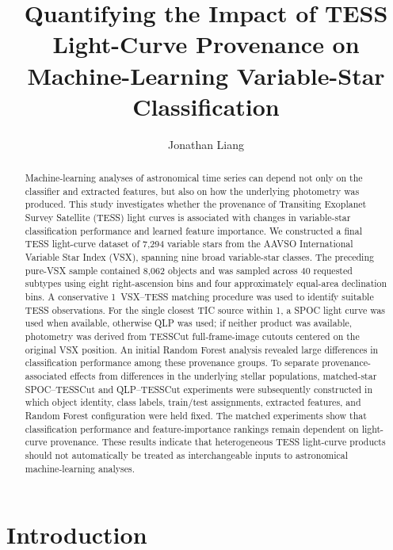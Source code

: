 \documentclass[linenumbers]{aastex701}
\begin{document}
\title{Quantifying the Impact of TESS Light-Curve Provenance on Machine-Learning Variable-Star Classification}
\author{Jonathan Liang}

\begin{abstract}
Machine-learning analyses of astronomical time series can depend not only on the classifier and extracted features, but also on how the underlying photometry was produced. This study investigates whether the provenance of Transiting Exoplanet Survey Satellite (TESS) light curves is associated with changes in variable-star classification performance and learned feature importance. We constructed a final TESS light-curve dataset of 7,294 variable stars from the AAVSO International Variable Star Index (VSX), spanning nine broad variable-star classes. The preceding pure-VSX sample contained 8,062 objects and was sampled across 40 requested subtypes using eight right-ascension bins and four approximately equal-area declination bins. A conservative 1\arcsec\ VSX--TESS matching procedure was used to identify suitable TESS observations. For the single closest TIC source within 1\arcsec, a SPOC light curve was used when available, otherwise QLP was used; if neither product was available, photometry was derived from TESSCut full-frame-image cutouts centered on the original VSX position. An initial Random Forest analysis revealed large differences in classification performance among these provenance groups. To separate provenance-associated effects from differences in the underlying stellar populations, matched-star SPOC--TESSCut and QLP--TESSCut experiments were subsequently constructed in which object identity, class labels, train/test assignments, extracted features, and Random Forest configuration were held fixed. The matched experiments show that classification performance and feature-importance rankings remain dependent on light-curve provenance. These results indicate that heterogeneous TESS light-curve products should not automatically be treated as interchangeable inputs to astronomical machine-learning analyses.
\end{abstract}


\section{Introduction}
\label{sec:introduction}
\end{document}

